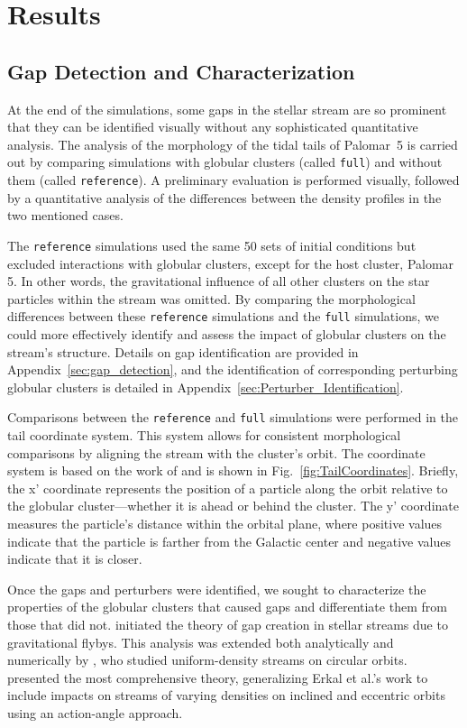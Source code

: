 \documentclass{aa}
\begin{document}
\section{Results}

  \subsection{Gap Detection and Characterization} \label{sec:gap_methods}

    At the end of the simulations, some gaps in the stellar stream are so prominent that they can be identified visually without any sophisticated quantitative analysis. The analysis of the morphology of the tidal tails of Palomar~5 is carried out by comparing simulations with globular clusters (called \texttt{full}) and without them (called \texttt{reference}). A preliminary evaluation is performed visually, followed by a quantitative analysis of the differences between the density profiles in the two mentioned cases. 


    The \texttt{reference} simulations used the same 50 sets of initial conditions but excluded interactions with globular clusters, except for the host cluster, Palomar 5. In other words, the gravitational influence of all other clusters on the star particles within the stream was omitted. By comparing the morphological differences between these \texttt{reference} simulations and the \texttt{full} simulations, we could more effectively identify and assess the impact of globular clusters on the stream's structure. Details on gap identification are provided in Appendix~\ref{sec:gap_detection}, and the identification of corresponding perturbing globular clusters is detailed in Appendix~\ref{sec:Perturber_Identification}.


    Comparisons between the \texttt{reference} and \texttt{full} simulations were performed in the tail coordinate system. This system allows for consistent morphological comparisons by aligning the stream with the cluster's orbit. The coordinate system is based on the work of \citet{2004AJ....127.2753D} and is shown in Fig.~\ref{fig:TailCoordinates}. Briefly, the x' coordinate represents the position of a particle along the orbit relative to the globular cluster—whether it is ahead or behind the cluster. The y' coordinate measures the particle's distance within the orbital plane, where positive values indicate that the particle is farther from the Galactic center and negative values indicate that it is closer.


    Once the gaps and perturbers were identified, we sought to characterize the properties of the globular clusters that caused gaps and differentiate them from those that did not. \citet{2013ApJ...775...90C} initiated the theory of gap creation in stellar streams due to gravitational flybys. This analysis was extended both analytically and numerically by \citet{2015MNRAS.450.1136E}, who studied uniform-density streams on circular orbits. \citet{2016MNRAS.457.3817S} presented the most comprehensive theory, generalizing Erkal et al.'s work to include impacts on streams of varying densities on inclined and eccentric orbits using an action-angle approach.
\end{document}
